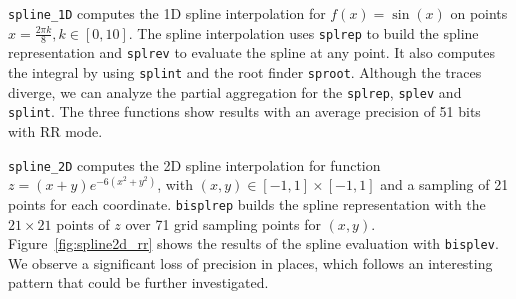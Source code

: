 \texttt{spline\_1D} computes the 1D spline interpolation for $f(x)=\sin(x)$ on
points $x=\frac{2\pi k}{8}, k \in [0, 10]$. The spline interpolation uses
\texttt{splrep} to build the spline representation and \texttt{splrev} to
evaluate the spline at any point. It also computes the integral by using
\texttt{splint} and the root finder \texttt{sproot}. Although the traces
diverge, we can analyze the partial aggregation for the \texttt{splrep},
\texttt{splev} and \texttt{splint}. The three functions show results with an
average precision of 51 bits with RR mode.

\texttt{spline\_2D} computes the 2D spline interpolation for function
$z=(x+y)e^{-6(x^2+y^2)}$, with $(x,y) \in [-1,1]\times[-1,1]$ and a sampling of
21 points for each coordinate. \texttt{bisplrep} builds the spline
representation with the $21 \times 21$ points of $z$ over 71 grid sampling
points for $(x,y)$. Figure~\ref{fig:spline2d_rr} shows the results of the spline
evaluation with \texttt{bisplev}.  We observe a significant loss of precision in
places, which follows an interesting pattern that could be further investigated.

